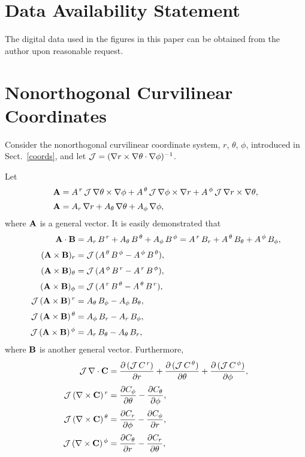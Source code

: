 \documentclass[12pt,prb,aps]{revtex4-1}
\begin{document}
\section*{Data Availability Statement}
The digital data used in the figures in this paper can be obtained from the author upon reasonable request.

\appendix
\section{Nonorthogonal Curvilinear Coordinates}\label{s2}
Consider the nonorthogonal curvilinear coordinate system, $r$, $\theta$, $\phi$,  introduced in Sect.~\ref{coords}, and let
${\cal J}=  (\nabla r\times \nabla\theta\cdot\nabla\phi)^{-1}$.

Let
\begin{align}
{\bf A} &= A^{\,r}\,{\cal J}\,\nabla\theta\times\nabla\phi
+  A^{\,\theta}\,{\cal J}\,\nabla\phi\times\nabla r
+  A^{\,\phi}\,{\cal J}\,\nabla r\times\nabla\theta,\\[0.5ex]
{\bf A} &= A_r\,\nabla r+A_\theta\,\nabla\theta+A_\phi\,\nabla\phi,
\end{align}
where ${\bf A}$ is a general vector.
It is easily demonstrated that
\begin{align}
{\bf A}\cdot{\bf B} &= A_r\,B^{\,r}+A_\theta \,B^{\,\theta}+A_\phi\,B^{\,\phi}=A^{\,r}\,B_r+A^{\,\theta}\,B_{\theta}+A^{\,\phi}\,B_\phi,\\[0.5ex]
({\bf A}\times {\bf B})_r &= {\cal J}\,(A^{\,\theta}\,B^{\,\phi}-A^{\,\phi}\,B^{\,\theta}),\label{crossdown1}\\[0.5ex]
({\bf A}\times {\bf B})_\theta &= {\cal J}\,(A^{\,\phi}\,B^{\,r}-A^{\,r}\,B^{\,\phi}),\label{crossdown2}\\[0.5ex]
({\bf A}\times {\bf B})_\phi &= {\cal J}\,(A^{\,r}\,B^{\,\theta}-A^{\,\theta}\,B^{\,r}),\label{crossdown3}\\[0.5ex]
{\cal J}\,({\bf A}\times {\bf B})^{\,r} &= A_{\theta}\,B_{\phi}-A_{\phi}\,B_{\theta},\label{crossup1}\\[0.5ex]
{\cal J}\,({\bf A}\times {\bf B})^{\,\theta} &= A_{\phi}\,B_{r}-A_{r}\,B_{\phi},\\[0.5ex]
{\cal J}\,({\bf A}\times {\bf B})^{\,\phi} &=A_{r}\,B_{\theta}-A_{\theta}\,B_{r},\label{crossup3}
\end{align}
where ${\bf B}$ is another general vector.
Furthermore,
\begin{align}
{\cal J}\,\nabla \cdot{\bf C} &= \frac{\partial\,({\cal J}\,C^{\,r})}{\partial r} + 
\frac{\partial\,({\cal J}\,C^{\,\theta})}{\partial \theta}+ 
\frac{\partial\,({\cal J}\,C^{\,\phi})}{\partial \phi},\label{div}\\[0.5ex]
{\cal J}\,(\nabla\times {\bf C})^{\,r}&= \frac{\partial C_\phi}{\partial \theta}
-\frac{\partial C_\theta}{\partial \phi},\label{curl1}\\[0.5ex]
{\cal J}\,(\nabla\times {\bf C})^{\,\theta}&= \frac{\partial C_r}{\partial \phi}
-\frac{\partial C_\phi}{\partial r},\\[0.5ex]
{\cal J}\,(\nabla\times {\bf C})^{\,\phi}&= \frac{\partial C_\theta}{\partial r}
-\frac{\partial C_r}{\partial \theta},\label{curl3}
\end{align}
\end{document}
